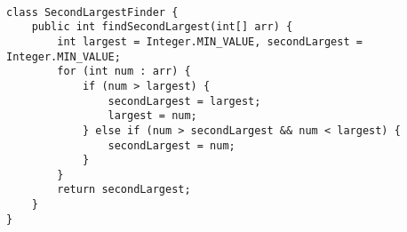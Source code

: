 \documentclass{article}
\begin{document}
\\
\begin{lstlisting}
class SecondLargestFinder {
    public int findSecondLargest(int[] arr) {
        int largest = Integer.MIN_VALUE, secondLargest = Integer.MIN_VALUE;
        for (int num : arr) {
            if (num > largest) {
                secondLargest = largest;
                largest = num;
            } else if (num > secondLargest && num < largest) {
                secondLargest = num;
            }
        }
        return secondLargest;
    }
}

\end{lstlisting}
\end{document}
